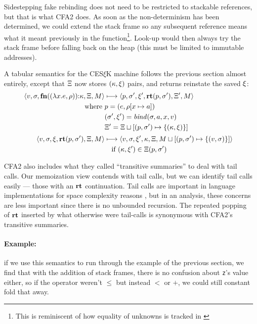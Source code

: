 Sidestepping fake rebinding does not need to be restricted to stackable references, but that is what CFA2 does.
%
As soon as the non-determinism has been determined, we could extend the stack frame so any subsequent reference means what it meant previously in the function\footnote{This is reminiscent of how equality of unknowns is tracked in \citet{ianjohnson:DBLP:journals/cacm/DilligDA10}}.
%
Look-up would then always try the stack frame before falling back on the heap (this must be limited to immutable addresses).

A tabular semantics for the CES$\xi$K machine follows the previous section almost entirely, except that $\Xi$ now stores $(\kappa, \xi)$ pairs, and returns reinstate the saved $\xi$:
\begin{align*}
  \langle v,\sigma,\mathbf{fn}{}((\lambda{} x. e, \rho)){\tt :} \kappa,\Xi,M \rangle &\longmapsto
  \langle p,
    \sigma',
    \xi',
    \mathbf{rt}(p, \sigma'),
    \Xi',
    M \rangle \\
  \text{where }
  & p = (e, \rho[x \mapsto a]) \\
  & (\sigma',\xi') = \mathit{bind}(\sigma,a,x,v) \\
  & \Xi' = \Xi\sqcup[(p, \sigma') \mapsto \{ (\kappa,\xi) \}]
\\[2pt]
 \langle v, \sigma, \xi, \mathbf{rt}(p,\sigma'), \Xi, M \rangle &\longmapsto
 \langle v, \sigma, \xi', \kappa, \Xi, M\sqcup[(p, \sigma') \mapsto \{ (v,\sigma) \}] \rangle
  \\ & \quad\text{if } (\kappa,\xi') \in \Xi(p, \sigma')
\end{align*}

CFA2 also includes what they called ``transitive summaries'' to deal with tail calls.
%
Our memoization view contends with tail calls, but we can identify tail calls easily --- those with an $\mathbf{rt}$ continuation.
%
Tail calls are important in language implementations for space complexity reasons \citep{ianjohnson:clinger:tail-calls:1998}, but in an analysis, these concerns are less important since there is no unbounded recursion.
%
The repeated popping of $\mathbf{rt}$ inserted by what otherwise were tail-calls is synonymous with CFA2's transitive summaries.

\paragraph{Example:} if we use this semantics to run through the example of the previous section, we find that with the addition of stack frames, there is no confusion about \texttt{z}'s value either, so if the operator weren't $\le$ but instead $<$ or $+$, we could still constant fold that away.

